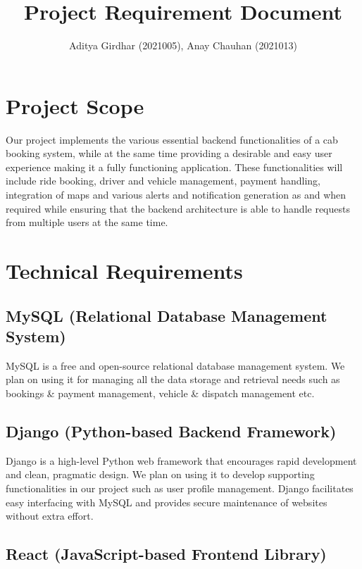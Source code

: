 \documentclass{article}
\title{Project Requirement Document}
\author{Aditya Girdhar (2021005), Anay Chauhan (2021013)}
\begin{document}
\maketitle

\section{Project Scope}

Our project implements the various essential backend functionalities of a cab booking system, while at the same time providing a desirable and easy user experience making it a fully functioning application. These functionalities will include ride booking, driver and vehicle management, payment handling, integration of maps and various alerts and notification generation as and when required while ensuring that the backend architecture is able to handle requests from multiple users at the same time.

\section{Technical Requirements}

\subsection{MySQL (Relational Database Management System)}

MySQL is a free and open-source relational database management system. We plan on using it for managing all the data storage and retrieval needs such as bookings \& payment management, vehicle \& dispatch management etc.

\subsection{Django (Python-based Backend Framework)}

Django is a high-level Python web framework that encourages rapid development and clean, pragmatic design. We plan on using it to develop supporting functionalities in our project such as user profile management. Django facilitates easy interfacing with MySQL and provides secure maintenance of websites without extra effort.

\subsection{React (JavaScript-based Frontend Library)}
\end{document}
